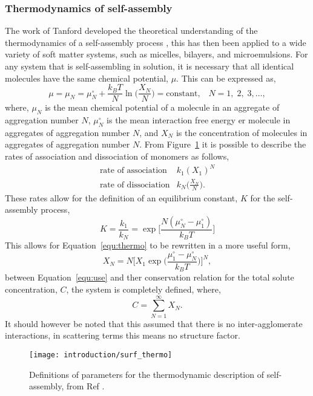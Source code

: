 \subsubsection{Thermodynamics of self-assembly}

The work of Tanford developed the theoretical understanding of the thermodynamics of a self-assembly process \cite{tanford_hydrophobic_1980}, this has then been applied to a wide variety of soft matter systems, such as micelles, bilayers, and microemulsions.
For any system that is self-assembling in solution, it is necessary that all identical molecules have the same chemical potential, $\mu$.
This can be expressed as,
%
\begin{equation}
\mu = \mu_N = \mu_N^{\circ} + \frac{k_BT}{N} \ln \Bigg(\frac{X_N}{N}\Bigg) = \text{constant},\;\;\;N = 1,\;2,\;3,\ldots,
\end{equation}
%
where, $\mu_N$ is the mean chemical potential of a molecule in an aggregate of aggregation number $N$, $\mu_N^{\circ}$ is the mean interaction free energy er molecule in aggregates of aggregation number $N$, and $X_N$ is the concentration of molecules in aggregates of aggregation number $N$.
From Figure~\ref{fig:thermo} it is possible to describe the rates of association and dissociation of monomers as follows,
%
\begin{equation}
\begin{aligned}
\text{rate of association} & k_1(X_1)^N \\
\text{rate of dissociation} & k_N\Bigg(\frac{X_N}{N}\Bigg).
\end{aligned}
\end{equation}
%
These rates allow for the definition of an equilibrium constant, $K$ for the self-assembly process,
%
\begin{equation}
K = \frac{k_1}{k_N} = \exp{\Bigg[\frac{N(\mu_N^\circ - \mu_1^\circ)}{k_BT}\Bigg]}
\end{equation}
%
This allows for Equation~\ref{equ:thermo} to be rewritten in a more useful form,
%
\begin{equation}
X_N = N \Bigg[X_1\exp\Bigg(\frac{\mu_1^\circ - \mu_N^\circ}{k_BT}\Bigg)\Bigg]^N,
\label{equ:use}
\end{equation}
%
between Equation~\ref{equ:use} and ther conservation relation for the total solute concentration, $C$, the system is completely defined, where,
%
\begin{equation}
C = \sum_{N=1}^{\infty}X_N.
\end{equation}
%
It should however be noted that this assumed that there is no inter-agglomerate interactions, in scattering terms this means no structure factor.
%
\begin{figure}
    \centering
    \texttt{[image: introduction/surf\_thermo]}
    \caption{Definitions of parameters for the thermodynamic description of self-assembly, from Ref \cite{israelachvili_intermolecular_2011}.}
    \label{fig:thermo}
\end{figure}
%

